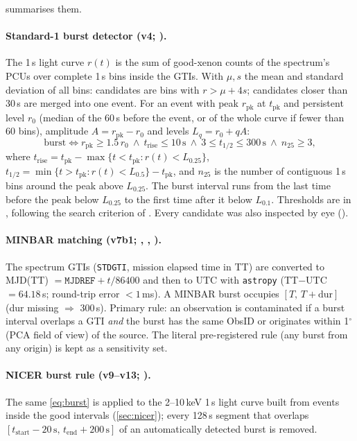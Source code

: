  summarises them.

\paragraph{Standard-1 burst detector (v4; ).} The 1\,s light curve $r(t)$ is the sum of
good-xenon counts of the spectrum's PCUs over complete 1\,s bins inside the GTIs. With $\mu,s$ the mean and standard
deviation of all bins: candidates are bins with $r>\mu+4s$; candidates closer than 30\,s are merged into one event. For
an event with peak $r_\mathrm{pk}$ at $t_\mathrm{pk}$ and persistent level $r_0$ (median of the 60\,s before the event, or
of the whole curve if fewer than 60 bins), amplitude $A=r_\mathrm{pk}-r_0$ and levels $L_q = r_0+qA$:
\begin{equation}
\text{burst} \iff r_\mathrm{pk}\ge 1.5\,r_0\ \wedge\ t_\mathrm{rise}\le 10\,\mathrm{s}\ \wedge\ 3\le t_{1/2}\le 300\,\mathrm{s}\ \wedge\ n_{25}\ge 3,\label{eq:burst}
\end{equation}
where $t_\mathrm{rise} = t_\mathrm{pk} - \max\{t<t_\mathrm{pk}: r(t)<L_{0.25}\}$,
$t_{1/2} = \min\{t>t_\mathrm{pk}: r(t)<L_{0.5}\} - t_\mathrm{pk}$, and $n_{25}$ is the number of contiguous 1\,s bins around
the peak above $L_{0.25}$. The burst interval runs from the last time before the peak below $L_{0.25}$ to the first time
after it below $L_{0.1}$. Thresholds are  in , following the search criterion of
\citet{Galloway2008}. Every candidate was also inspected by eye ().

\paragraph{MINBAR matching (v7b1; , , ).} The spectrum GTIs
(\texttt{STDGTI}, mission elapsed time in TT) are converted to MJD(TT) $=\mathtt{MJDREF}+t/86400$ and then to UTC with
\texttt{astropy} (TT$-$UTC $=64.18$\,s; round-trip error $<1$\,ms). A MINBAR burst occupies $[T,\,T+\mathrm{dur}]$
(dur missing $\Rightarrow$ 300\,s). Primary rule: an observation is contaminated if a burst interval overlaps a GTI
\emph{and} the burst has the same ObsID or originates within 1$^\circ$ (PCA field of view) of the source. The literal
pre-registered rule (any burst from any origin) is kept as a sensitivity set.

\paragraph{NICER burst rule (v9--v13; ).} The same \cref{eq:burst} is applied to the
2--10\,keV 1\,s light curve built from events inside the good intervals (\cref{sec:nicer}); every 128\,s segment that
overlaps $[t_\mathrm{start}-20\,\mathrm{s},\,t_\mathrm{end}+200\,\mathrm{s}]$ of an automatically detected burst is removed.

